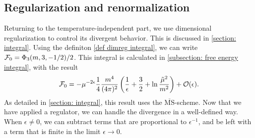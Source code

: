 \subsection{Regularization and renormalization}
\label{subsection: renormalization}


Returning to the temperature-independent part, we use dimensional regularization to control its divergent behavior.
This is discussed in \autoref{section: integral}.
Using the definiton \autoref{def dimreg integral}, we can write $\mathcal{F}_0 = \Phi_3(m, 3, -1/2) / 2$.
This integral is calculated in \autoref{subsection: free energy integral}, with the result
%
\begin{equation}
    \mathcal{F}_0 =
    - \mu^{-2\epsilon} \frac{1}{4}\frac{m^4}{(4 \pi)^2}
    \left(
        \frac{1}{\epsilon} 
        + \frac{3}{2}
        + \ln \frac{\tilde\mu^2}{m^2}
    \right)
    + \mathcal O(\epsilon).
\end{equation}
%
As detailed in \autoref{section: integral}, this result uses the $\overline{\text{MS}}$-scheme.
Now that we have applied a regulator, we can handle the divergence in a well-defined way.
When $\epsilon \neq 0$, we can subtract terms that are proportional to $\epsilon^{-1}$, and be left with a term that is finite in the limit $\epsilon \rightarrow 0$.

